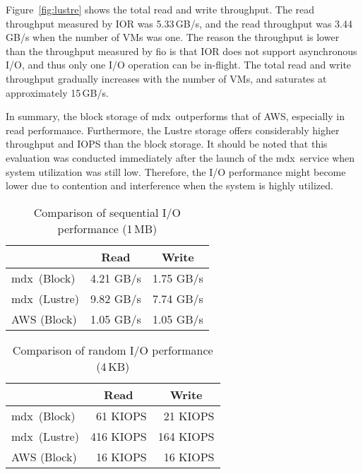 \documentclass[a4paper,twoside]{article}
\newcommand{\mdx}{mdx\,\uppercase\expandafter{\romannumeral 2\relax}}
\begin{document}
Figure~\ref{fig:lustre} shows the total
read and write throughput. The read throughput measured by IOR was 5.33\,GB/s, and the read
throughput was 3.44\,GB/s when the number of VMs was one. The reason the throughput is lower than
the throughput measured by fio is that IOR does not support asynchronous I/O, and thus only one I/O
operation can be in-flight. The total read and write throughput gradually increases with the number
of VMs, and saturates at approximately 15\,GB/s.

In summary, the block storage of \mdx{} outperforms that of AWS, especially in read performance.
Furthermore, the Lustre storage offers considerably higher throughput and IOPS than the block
storage.
It should be noted that this
evaluation was conducted immediately after the launch of the \mdx{} service when system utilization
was still low. Therefore, the I/O performance might become lower due to contention and interference when
the system is highly utilized.

\begin{table}
\centering
\caption{Comparison of sequential I/O performance (1\,MB)}\label{tbl:io-seq}
\begin{tabular}{@{}lrr@{}}
\toprule
\multicolumn{1}{c}{} & \multicolumn{1}{c}{Read} & \multicolumn{1}{c}{Write} \\ \midrule
\mdx{} (Block)       & 4.21 GB/s                & 1.75 GB/s                 \\
\mdx{} (Lustre)      & 9.82 GB/s                & 7.74 GB/s                 \\
AWS (Block)          & 1.05 GB/s                & 1.05 GB/s                  \\ \bottomrule
\end{tabular}
\end{table}

\begin{table}
\centering
\caption{Comparison of random I/O performance (4\,KB)}\label{tbl:io-rnd}
\begin{tabular}{@{}lrr@{}}
\toprule
\multicolumn{1}{c}{} & \multicolumn{1}{c}{Read} & \multicolumn{1}{c}{Write} \\ \midrule
\mdx{} (Block)       & 61 KIOPS                 & 21 KIOPS                  \\
\mdx{} (Lustre)      & 416 KIOPS                & 164 KIOPS                 \\
AWS (Block)          & 16 KIOPS                 & 16 KIOPS                  \\ \bottomrule
\end{tabular}
\end{table}
\end{document}
